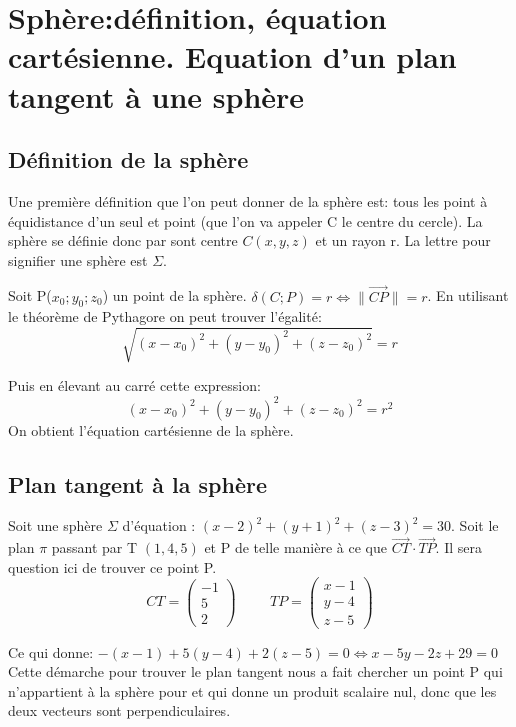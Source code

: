 \documentclass[12pt,a4paper]{report}
\begin{document}
	\chapter[Géométrie dans l'espace]{Sphère:définition, équation cartésienne. Equation d'un plan tangent à une sphère}
	\section*{Définition de la sphère}
	Une première définition que l'on peut donner de la sphère est: tous les point à équidistance d'un seul et point (que l'on va appeler C le centre du cercle). La sphère se définie donc par sont centre $C(x,y,z)$ et un rayon r. La lettre pour signifier une sphère est $\Sigma$.
	\vspace{10cm}
	
	Soit P($x_0;y_0;z_0$) un point de la sphère. $\delta(C;P)=r \Leftrightarrow \| \overrightarrow{CP} \|=r $.
	En utilisant le théorème de Pythagore on peut trouver l'égalité: \[ \sqrt{(x-x_0)^2+(y-y_0)^2+(z-z_0)^2}=r \] 
	
	Puis en élevant au carré cette expression: \[ (x-x_0)^2+(y-y_0)^2+(z-z_0)^2=r^2 \]
	On obtient l'équation cartésienne de la sphère.
	\pagebreak
	
	\section*{Plan tangent à la sphère}
	\vspace{10cm}
	Soit une sphère $\Sigma$ d'équation : $(x-2)^2+(y+1)^2+(z-3)^2=30$. Soit le plan $\pi$ passant par T $(1,4,5)$ et P de telle manière à ce que $\overrightarrow{CT}\cdot\overrightarrow{TP}$. Il sera question ici de trouver ce point P. 
	\[CT=\left( \begin{array}{c}
	-1 \\
	5 \\
	2
	\end{array} \right) \hspace{1cm} TP=\left( \begin{array}{c}
						x-1 \\
						y-4 \\
						z-5
						\end{array} \right)\]
	
	Ce qui donne: $-(x-1)+5(y-4)+2(z-5)=0 \Leftrightarrow x-5y-2z+29=0$
	Cette démarche pour trouver le plan tangent nous a fait chercher un point P qui n'appartient à la sphère pour et qui donne un produit scalaire nul, donc que les deux vecteurs sont perpendiculaires. 
	
\end{document}

